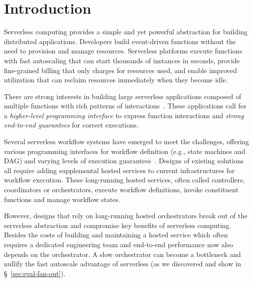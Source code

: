 \section{Introduction}

Serverless computing provides a simple and yet powerful abstraction for
building distributed applications.  Developers build event-driven functions
without the need to provision and manage resources. Serverless platforms
execute functions with fast autoscaling that can start thousands of instances
in seconds, provide fine-grained billing that only charges for resources used, and
enable improved utilization that can reclaim resources immediately when they become
idle.

There are strong interests in building large serverless applications composed
of multiple functions with rich patterns of interactions~\cite{excamera,
pywren, gg-atc, beldi, boki}.  These applications call for a
\emph{higher-level programming interface} to express function interactions and
\emph{strong end-to-end guarantees} for correct executions.

Several serverless workflow systems have emerged to meet the challenges,
offering various programming interfaces for workflow definition
 (e.g., state machines and
DAG) and varying levels of execution guarantees~\cite{excamera, gg-atc,
aws-step-functions, google-cloud-composer, google-workflows,
durable-functions}. Designs of existing solutions all require adding
supplemental hosted services to current infrastructures for workflow
execution. These long-running hosted services, often called controllers,
coordinators or orchestrators, execute workflow definitions, invoke
constituent functions and manage workflow states.


However, designs that rely on long-running hosted orchestrators break out of
the serverless abstraction and compromise key benefits of serverless
computing. Besides the costs of building and maintaining a hosted service
which often requires a dedicated engineering team and end-to-end performance now
also depends on the orchestrator. A slow orchestrator can become a
bottleneck and nullify the fast autoscale advantage of serverless (as we
discovered and show in \S~\ref{sec:eval-fan-out}).

